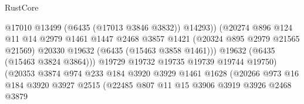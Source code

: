 \begin{lexlean}{RustCore}
\begin{coremodule}
                                              @17010
                                              @13499
                                              (@6435 (@17013 @3846 @3832))
                                              @14293))
                                          (@20274
                                            @896
                                            @124
                                            @11
                                            @14
                                            @2979
                                            @1461
                                            @1447
                                            @2468
                                            @3857
                                            @1421
                                            (@20324 @895 @2979 @21565 @21569)
                                            @20330
                                            @19632
                                            (@6435 (@15463 @3858 @1461)))
                                          @19632
                                          (@6435 (@15463 @3824 @3864)))
                                        @19729
                                        @19732
                                        @19735
                                        @19739
                                        @19744
                                        @19750)
                                      (@20353
                                        @3874
                                        @974
                                        @233
                                        @184
                                        @3920
                                        @3929
                                        @1461
                                        @1628
                                        (@20266
                                          @973
                                          @16
                                          @184
                                          @3920
                                          @3927
                                          @2515
                                          (@22485
                                            @807
                                            @11
                                            @15
                                            @3906
                                            @3919
                                            @3926
                                            @2468
                                            @3879

\end{coremodule}
\end{lexlean}
